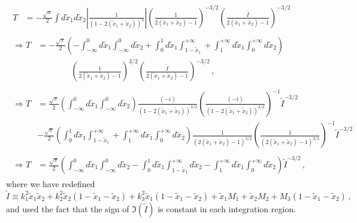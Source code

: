 \documentclass[twoside]{article}
\begin{document}
\begin{align}
\begin{split}
T &=  -\frac{\sqrt{\pi}}{2}\int d\tilde{x}_1 d\tilde{x}_2 \left|\frac{1}{(1-2(\tilde{x}_1 + \tilde{x}_2))^3}\right|\left(\frac{1}{2(\tilde{x}_1 + \tilde{x}_2) - 1}\right)^{-3/2} \left(\frac{ \tilde{I}}{2 (\tilde{x}_1+ \tilde{x}_2)-1} \right)^{-3/2}
\end{split}\\
\begin{split}
\Rightarrow T &=  -\frac{\sqrt{\pi}}{2}\left(-\int_{-\infty}^0 d\tilde{x}_1 \int_{-\infty}^0 d\tilde{x}_2 + \int_0^1 d\tilde{x}_1 \int_{1-\tilde{x}_1}^{+\infty} + \int_{1}^{+\infty} d\tilde{x}_1 \int_{0}^{+\infty}d\tilde{x}_2 \right) \\
& \qquad \qquad \left(\frac{1}{2(\tilde{x}_1 + \tilde{x}_2) - 1}\right)^{3/2}
\left( \frac{\tilde{I}}{2 (\tilde{x}_1+ \tilde{x}_2)-1} \right)^{-3/2}\,,
\end{split} \\
\begin{split}
\Rightarrow T &=  \frac{\sqrt{\pi}}{2}\left(\int_{-\infty}^0 d\tilde{x}_1 \int_{-\infty}^0 d\tilde{x}_2 \right) 
\frac{(-i)}{(1-2(\tilde{x}_1 + \tilde{x}_2) )^{3/2}} \left(\frac{(-i)}{(1-2(\tilde{x}_1 + \tilde{x}_2) )^{3/2}}\right)^{-1} \tilde{I}^{-3/2} \\
&- \frac{\sqrt{\pi}}{2}\left(\int_0^1 d\tilde{x}_1 \int_{1-\tilde{x}_1}^{+\infty} + \int_{1}^{+\infty} d\tilde{x}_1 \int_{0}^{+\infty}d\tilde{x}_2 \right) 
\frac{1}{(2(\tilde{x}_1 + \tilde{x}_2)-1 )^{3/2}} \left(\frac{1}{(2(\tilde{x}_1 + \tilde{x}_2)-1 )^{3/2}}\right)^{-1} \tilde{I}^{-3/2}
\end{split}\\
\begin{split}
\Rightarrow T &=  \frac{\sqrt{\pi}}{2}\left(\int_{-\infty}^0 d\tilde{x}_1 \int_{-\infty}^0 d\tilde{x}_2 -\int_0^1 d\tilde{x}_1 \int_{1-\tilde{x}_1}^{+\infty}d\tilde{x}_2 - \int_{1}^{+\infty} d\tilde{x}_1 \int_{0}^{+\infty}d\tilde{x}_2\right) \tilde{I}^{-3/2} \,,
\end{split}
\end{align}
where we have redefined 
\begin{equation}
\tilde{I} \equiv k_1^2 \tilde{x}_1 \tilde{x}_2 + k_2^2 \tilde{x}_2 (1 -\tilde{x}_1 - \tilde{x}_2 )+k_3^2 \tilde{x}_1 (1 - \tilde{x}_1 - \tilde{x}_2) + \tilde{x}_1 M_1 + \tilde{x}_2  M_2 + M_3 (1-\tilde{x}_1-\tilde{x}_2)\,,
\end{equation}
and used the fact that the sign of $\Im(\tilde{I})$ is constant in each integration region.
\end{document}

